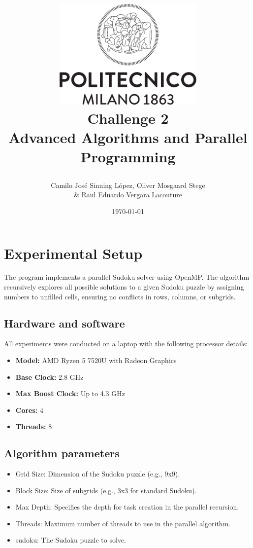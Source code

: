 \documentclass[a4paper,11pt]{article}
\title{
    \vspace{2cm} %
    \includegraphics[width=0.55\textwidth]{Logo_Polimi.png} \\ %
    \vspace{1cm} %
    \textbf{\Huge Challenge 2} \\
    \vspace{1cm} %
    \large Advanced Algorithms and Parallel Programming \\
    \vspace{0.5cm} %
    \large \date{\today}
}
\author{Camilo José Sinning López, Oliver Mosgaard Stege\\ \& Raul Eduardo Vergara Lacouture}
\begin{document}
\maketitle
\thispagestyle{empty}
\newpage

\setcounter{page}{1}  %


\section{Experimental Setup}

The program implements a parallel Sudoku solver using OpenMP. The algorithm recursively explores all possible solutions to a given Sudoku puzzle by assigning numbers to unfilled cells, ensuring no conflicts in rows, columns, or subgrids.

\subsection{Hardware and software}

All experiments were conducted on a laptop with the following processor details:

\begin{itemize}
    \item \textbf{Model:} AMD Ryzen 5 7520U with Radeon Graphics
    \item \textbf{Base Clock:} 2.8 GHz
    \item \textbf{Max Boost Clock:} Up to 4.3 GHz
    \item \textbf{Cores:} 4
    \item \textbf{Threads:} 8
\end{itemize}

\subsection{Algorithm parameters}

\begin{itemize}
    \item Grid Size: Dimension of the Sudoku puzzle (e.g., 9x9).
    \item Block Size: Size of subgrids (e.g., 3x3 for standard Sudoku).
    \item Max Depth: Specifies the depth for task creation in the parallel recursion.
    \item Threads: Maximum number of threads to use in the parallel algorithm.
    \item sudoku: The Sudoku puzzle to solve.
\end{itemize}
\end{document}
